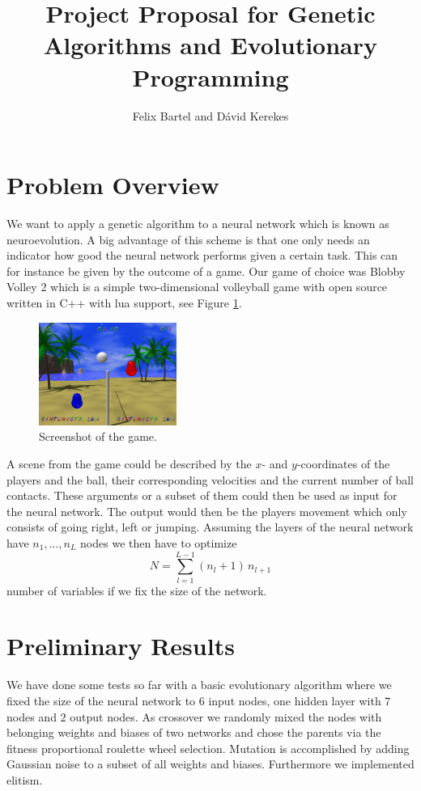 \documentclass[11pt,a4paper]{scrartcl}
\date{}
\title{Project Proposal for Genetic Algorithms and Evolutionary Programming}
\author{Felix Bartel and D\'avid Kerekes}
\begin{document}
\maketitle

\section{Problem Overview}

We want to apply a genetic algorithm to a neural network which is known as neuroevolution.
A big advantage of this scheme is that one only needs an indicator how good the neural network performs given a certain task.
This can for instance be given by the outcome of a game.
Our game of choice was Blobby Volley 2 which is a simple two-dimensional volleyball game with open source written in C++ with lua support, see Figure \ref{fig:screenshot}.

\begin{figure}[H]
\center
\includegraphics[width=0.4\textwidth]{img/screenshot.png}
\caption{Screenshot of the game.}
\label{fig:screenshot}
\end{figure}

A scene from the game could be described by the $x$- and $y$-coordinates of the players and the ball, their corresponding velocities and the current number of ball contacts.
These arguments or a subset of them could then be used as input for the neural network.
The output would then be the players movement which only consists of going right, left or jumping.
Assuming the layers of the neural network have $n_1,\dots,n_L$ nodes we then have to optimize \[N = \sum_{l=1}^{L-1} (n_l+1) \, n_{l+1}\] number of variables if we fix the size of the network.

\section*{Preliminary Results}

We have done some tests so far with a basic evolutionary algorithm \cite{github_repo} where we fixed the size of the neural network to $6$ input nodes, one hidden layer with $7$ nodes and $2$ output nodes.
As crossover we randomly mixed the nodes with belonging weights and biases of two networks and chose the parents via the fitness proportional roulette wheel selection.
Mutation is accomplished by adding Gaussian noise to a subset of all weights and biases.
Furthermore we implemented elitism.
\end{document}
